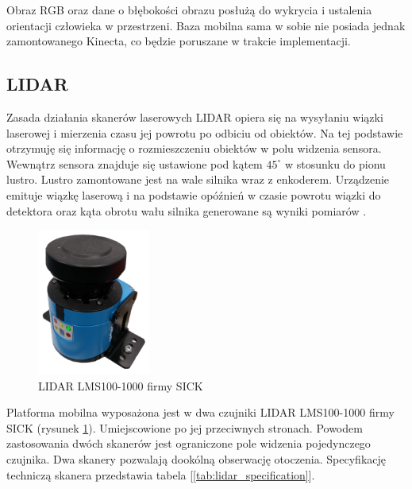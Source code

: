 Obraz RGB oraz dane o błębokości obrazu posłużą do wykrycia i ustalenia orientacji człowieka w przestrzeni. Baza mobilna sama w sobie nie posiada jednak zamontowanego Kinecta, co będzie poruszane w trakcie implementacji.\\

\subsection{LIDAR}

Zasada działania skanerów laserowych LIDAR opiera się na wysyłaniu wiązki laserowej i mierzenia czasu jej powrotu po odbiciu od obiektów. Na tej podstawie otrzymuję się informację o rozmieszczeniu obiektów w polu widzenia sensora. Wewnątrz sensora znajduje się ustawione pod kątem $45^{\circ}$ w stosunku do pionu lustro. Lustro zamontowane jest na wale silnika wraz z enkoderem. Urządzenie emituje wiązkę laserową i na podstawie opóźnień w czasie powrotu wiązki do detektora oraz kąta obrotu wału silnika generowane są wyniki pomiarów \cite{lidar}. 


\begin{figure}[H]
	\centering
	\includegraphics[width=0.33\textwidth]{gfx/lidar.png}
	\caption{LIDAR LMS100-1000 firmy SICK}
	\label{fig:sick}
\end{figure}


Platforma mobilna wyposażona jest w dwa czujniki LIDAR LMS100-1000 firmy SICK (rysunek \ref{fig:sick}). Umiejscowione po jej przeciwnych stronach. Powodem zastosowania dwóch skanerów jest ograniczone pole widzenia pojedynczego czujnika. Dwa skanery pozwalają dookólną obserwację otoczenia. Specyfikację techniczą skanera przedstawia tabela [\ref{tab:lidar_specification}].

